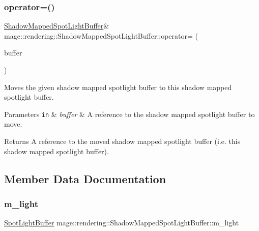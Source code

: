 \subsubsection{\texorpdfstring{operator=()}{operator=()}\hspace{0.1cm}{\footnotesize\ttfamily [2/2]}}
{\footnotesize\ttfamily \hyperlink{structmage_1_1rendering_1_1_shadow_mapped_spot_light_buffer}{Shadow\+Mapped\+Spot\+Light\+Buffer}\& mage\+::rendering\+::\+Shadow\+Mapped\+Spot\+Light\+Buffer\+::operator= (\begin{DoxyParamCaption}\item[{\hyperlink{structmage_1_1rendering_1_1_shadow_mapped_spot_light_buffer}{Shadow\+Mapped\+Spot\+Light\+Buffer} \&\&}]{buffer }\end{DoxyParamCaption})\hspace{0.3cm}{\ttfamily [default]}}

Moves the given shadow mapped spotlight buffer to this shadow mapped spotlight buffer.


\begin{DoxyParams}[1]{Parameters}
\mbox{\tt in}  & {\em buffer} & A reference to the shadow mapped spotlight buffer to move. \\
\hline
\end{DoxyParams}
\begin{DoxyReturn}{Returns}
A reference to the moved shadow mapped spotlight buffer (i.\+e. this shadow mapped spotlight buffer). 
\end{DoxyReturn}


\subsection{Member Data Documentation}
\hypertarget{structmage_1_1rendering_1_1_shadow_mapped_spot_light_buffer_a1df0d45520394b125e77b806f1b6265d}{}\label{structmage_1_1rendering_1_1_shadow_mapped_spot_light_buffer_a1df0d45520394b125e77b806f1b6265d} 
\subsubsection{\texorpdfstring{m\+\_\+light}{m\_light}}
{\footnotesize\ttfamily \hyperlink{structmage_1_1rendering_1_1_spot_light_buffer}{Spot\+Light\+Buffer} mage\+::rendering\+::\+Shadow\+Mapped\+Spot\+Light\+Buffer\+::m\+\_\+light}


